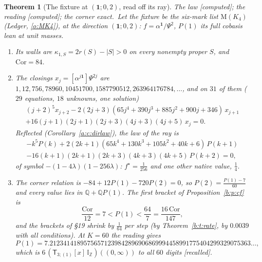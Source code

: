 \documentclass[11pt]{article}
\newcommand{\one}{\mathbf 1}
\newcommand{\sT}{\mathsf T}
\newcommand{\IZ}{\mathbb I_{\mathbb Z}}
\newcommand{\Tx}[3]{(\sT_{#1;(1)}[x]\,#2)((#3,\infty))}
\theoremstyle{plain}
\newtheorem{theorem}[proposition]{Theorem}
\theoremstyle{definition}
\theoremstyle{remark}
\newcommand{\computed}{\textup{[computed]}}
\newcommand{\recalled}{\textup{[recalled]}}
\begin{document}
\begin{theorem}[The fixture at $(\one;0,2)$, read off its ray]\label{b:t:fixture}The law \computed; the reading \computed; the corner exact.\
Let the fixture be the six-mark list $\mathrm M(K_4)$ (Ledger, \ref{o:MK4}), at the direction $(\one;0,2)$: $f=\alpha^{\one}/\Psi^2$, $P(1)$ its full cobasis lean at unit masses.
\begin{enumerate}[label=(\roman*)]
\item Its walls are $\kappa_{1,S}=2r(S)-|S|>0$ on every nonempty proper $S$, and $\mathrm{Cor}=84$.
\item The closings $x_j=[\alpha^{j\one}]\Psi^{2j}$ are $1,12,756,78960,10451700,1587790512,263964176784,\dots$, and on $31$ of them ($29$ equations, $18$ unknowns, one solution)
\begin{multline*}
(j+2)^5x_{j+2}-2(2j+3)(65j^4+390j^3+885j^2+900j+346)\,x_{j+1}\\
+16(j+1)(2j+1)(2j+3)(4j+3)(4j+5)\,x_j=0 .
\end{multline*}
Reflected (Corollary~\ref{a:c:dirlaw}), the law of the ray is
\begin{multline*}
-k^5P(k)+2(2k+1)(65k^4+130k^3+105k^2+40k+6)\,P(k+1)\\
-16(k+1)(2k+1)(2k+3)(4k+3)(4k+5)\,P(k+2)=0,
\end{multline*}
of symbol $-(1-4\lambda)(1-256\lambda)$: $f^\star=\frac1{256}$ and one other native value, $\frac14$.
\item The corner relation is $-84+12P(1)-720P(2)=0$, so $P(2)=\frac{P(1)-7}{60}$ and every value lies in $\mathbb Q+\mathbb Q P(1)$. The first bracket of Proposition~\ref{b:p:cf} is
\[
\frac{\mathrm{Cor}}{12}=7<P(1)<\frac{64}7=\frac{16\,\mathrm{Cor}}{147},
\]
and the brackets of \S19 shrink by $\frac1{64}$ per step (by Theorem~\ref{b:t:rate}, by $0.0039$ with all conditions). At $K=60$ the reading gives
\[
P(1)=7.21234141895756571239842896906869994458991775404299329075363\ldots,
\]
which is $6\,\Tx3{\IZ}0$ to all $60$ digits \recalled.
\end{enumerate}
\end{theorem}
\end{document}
